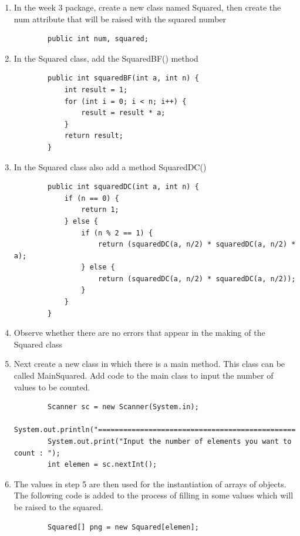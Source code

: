 \documentclass[12pt,titlepage]{article}
\begin{document}
\begin{enumerate}
    \item In the week 3 package, create a new class named Squared, then create the num attribute that will be raised with the squared number
    \begin{verbatim}
        public int num, squared;
    \end{verbatim}
    \item In the Squared class, add the SquaredBF() method
    \begin{verbatim}
        public int squaredBF(int a, int n) {
            int result = 1;
            for (int i = 0; i < n; i++) {
                result = result * a;
            }
            return result;
        }
    \end{verbatim}
    \item In the Squared class also add a method SquaredDC()
    \begin{verbatim}
        public int squaredDC(int a, int n) {
            if (n == 0) {
                return 1;
            } else {
                if (n % 2 == 1) {
                    return (squaredDC(a, n/2) * squaredDC(a, n/2) * a);
                } else {
                    return (squaredDC(a, n/2) * squaredDC(a, n/2));
                }
            }
        }
    \end{verbatim}
    \item Observe whether there are no errors that appear in the making of the Squared class
    \item Next create a new class in which there is a main method. This class can be called MainSquared. Add code to the main class to input the number of values to be counted.
    \begin{verbatim}
        Scanner sc = new Scanner(System.in);
        System.out.println("================================================");
        System.out.print("Input the number of elements you want to count : ");
        int elemen = sc.nextInt();
    \end{verbatim}
    \item The values in step 5 are then used for the instantiation of arrays of objects. The following code is added to the process of filling in some values which will be raised to the squared.
    \begin{verbatim}
        Squared[] png = new Squared[elemen];
        

\end{verbatim}
\end{enumerate}
\end{document}
